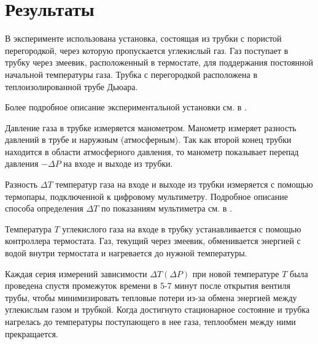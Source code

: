 \section{Результаты}

В эксперименте использована установка, состоящая из трубки с пористой перегородкой, через которую пропускается углекислый газ. Газ поступает в трубку через змеевик, расположенный в термостате, для поддержания постоянной начальной температуры газа. Трубка с перегородкой расположена в теплоизолированной трубе Дьюара.

Более подробное описание экспериментальной установки см. в .

Давление газа в трубке измеряется манометром. Манометр измеряет разность давлений в трубе и наружным (атмосферным). Так как второй конец трубки находится в области атмосферного давления, то манометр показывает перепад давления $-\Delta P$ на входе и выходе из трубки.

Разность $\Delta T$ температур газа на входе и выходе из трубки измеряется с помощью термопары, подключенной к цифровому мультиметру. Подробное описание способа определения $\Delta T$ по показаниям мультиметра см. в .

Температура $T$ углекислого газа на входе в трубку устанавливается с помощью контроллера термостата. Газ, текущий через змеевик, обменивается энергией с водой внутри термостата и нагревается до нужной температуры.

Каждая серия измерений зависимости $\Delta T(\Delta P)$ при новой температуре $T$ была проведена спустя промежуток времени в 5-7 минут после открытия вентиля трубы, чтобы минимизировать тепловые потери из-за обмена энергией между углекислым газом и трубкой. Когда достигнуто стационарное состояние и трубка нагрелась до температуры поступающего в нее газа, теплообмен между ними прекращается.

